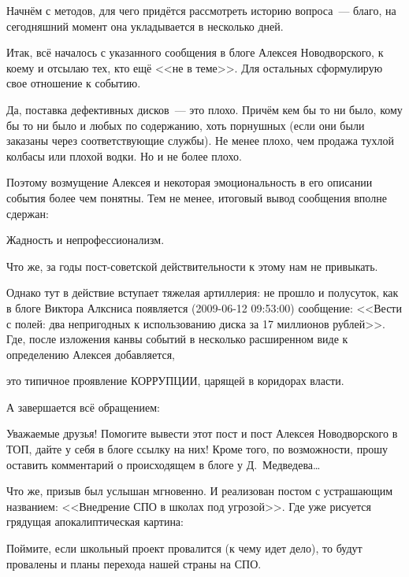 Начнём с методов, для чего придётся рассмотреть историю вопроса~--- благо, на сегодняшний момент она укладывается в несколько дней.

Итак, всё началось с указанного сообщения в блоге Алексея Новодворского, к коему и отсылаю тех, кто ещё <<не в теме>>. Для остальных сформулирую свое отношение к событию.

Да, поставка дефективных дисков~--- это плохо. Причём кем бы то ни было, кому бы то ни было и любых по содержанию, хоть порнушных (если они были заказаны через соответствующие службы). Не менее плохо, чем продажа тухлой колбасы или плохой водки. Но и не более плохо.

Поэтому возмущение Алексея и некоторая эмоциональность в его описании события более чем понятны. Тем не менее, итоговый вывод сообщения вполне сдержан:


\begin{shadequote}{}
Жадность и непрофессионализм.
\end{shadequote}

Что же, за годы пост-советской действительности к этому нам не привыкать.

Однако тут в действие вступает тяжелая артиллерия: не прошло и полусуток, как в блоге Виктора Алксниса появляется (2009-06-12 09:53:00) сообщение: <<Вести с полей: два непригодных к использованию диска за 17 миллионов рублей>>. Где, после изложения канвы событий в несколько расширенном виде к определению Алексея добавляется,


\begin{shadequote}{}
 это типичное проявление КОРРУПЦИИ, царящей в коридорах власти.
\end{shadequote}

А завершается всё обращением:


\begin{shadequote}{}
Уважаемые друзья! Помогите вывести этот пост и пост Алексея Новодворского в ТОП, дайте у себя в блоге ссылку на них! Кроме того, по возможности, прошу оставить комментарий о происходящем в блоге у Д.~Медведева\dots
\end{shadequote}

Что же, призыв был услышан мгновенно. И реализован постом с устрашающим названием: <<Внедрение СПО в школах под угрозой>>. Где уже рисуется грядущая апокалиптическая картина:


\begin{shadequote}{}
Поймите, если школьный проект провалится (к чему идет дело), то будут провалены и планы перехода нашей страны на СПО.
\end{shadequote}

